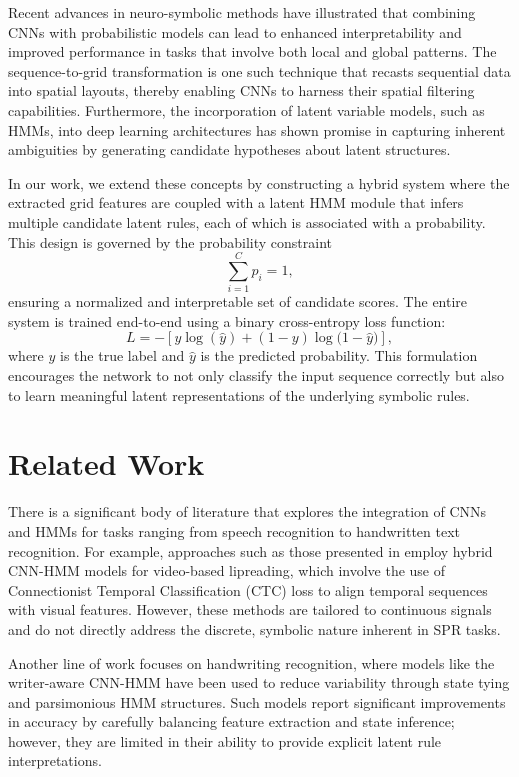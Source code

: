 \documentclass[11pt]{article}
\begin{document}
Recent advances in neuro-symbolic methods have illustrated that combining CNNs with probabilistic models can lead to enhanced interpretability and improved performance in tasks that involve both local and global patterns. The sequence-to-grid transformation is one such technique that recasts sequential data into spatial layouts, thereby enabling CNNs to harness their spatial filtering capabilities. Furthermore, the incorporation of latent variable models, such as HMMs, into deep learning architectures has shown promise in capturing inherent ambiguities by generating candidate hypotheses about latent structures.

In our work, we extend these concepts by constructing a hybrid system where the extracted grid features are coupled with a latent HMM module that infers multiple candidate latent rules, each of which is associated with a probability. This design is governed by the probability constraint 
\[
\sum_{i=1}^{C} p_i = 1,
\]
ensuring a normalized and interpretable set of candidate scores. The entire system is trained end-to-end using a binary cross-entropy loss function:
\[
L = -\left[y \log(\hat{y}) + (1-y) \log\bigl(1-\hat{y}\bigr)\right],
\]
where \( y \) is the true label and \( \hat{y} \) is the predicted probability. This formulation encourages the network to not only classify the input sequence correctly but also to learn meaningful latent representations of the underlying symbolic rules.

\section{Related Work}
There is a significant body of literature that explores the integration of CNNs and HMMs for tasks ranging from speech recognition to handwritten text recognition. For example, approaches such as those presented in \cite{arxiv1906.12170v1} employ hybrid CNN-HMM models for video-based lipreading, which involve the use of Connectionist Temporal Classification (CTC) loss to align temporal sequences with visual features. However, these methods are tailored to continuous signals and do not directly address the discrete, symbolic nature inherent in SPR tasks.

Another line of work focuses on handwriting recognition, where models like the writer-aware CNN-HMM \cite{arxiv1812.09809v2} have been used to reduce variability through state tying and parsimonious HMM structures. Such models report significant improvements in accuracy by carefully balancing feature extraction and state inference; however, they are limited in their ability to provide explicit latent rule interpretations.
\end{document}
